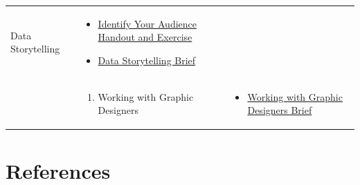 \documentclass[
]{book}
\providecommand{\tightlist}{%
  \setlength{\itemsep}{0pt}\setlength{\parskip}{0pt}}
\begin{document}
\begin{longtable}[]{@{}lll@{}}
\begin{minipage}[t]{0.34\columnwidth}
\begin{enumerate}
  Data Storytelling
\end{enumerate}\strut
\end{minipage} & \begin{minipage}[t]{0.42\columnwidth}\raggedright
\begin{itemize}
\tightlist
\item
  \href{files/M4S2_Data_Storytelling_Audience_Handout_Exercise.pdf}{Identify Your Audience Handout and Exercise}
\item
  \href{files/M4S2_Data_Storytelling_Brief.pdf}{Data Storytelling Brief}
\end{itemize}\strut
\end{minipage}\tabularnewline
\begin{minipage}[t]{0.15\columnwidth}\raggedright
\strut
\end{minipage} & \begin{minipage}[t]{0.34\columnwidth}\raggedright
\begin{enumerate}
\def\labelenumi{\arabic{enumi}.}
\setcounter{enumi}{2}
\tightlist
\item
  Working with Graphic Designers
\end{enumerate}\strut
\end{minipage} & \begin{minipage}[t]{0.42\columnwidth}\raggedright
\begin{itemize}
\tightlist
\item
  \href{files/M4S3_Working_With_Graphic_Designers_Brief.pdf}{Working with Graphic Designers Brief}
\end{itemize}\strut
\end{minipage}\tabularnewline
\bottomrule
\end{longtable}

\hypertarget{references}{%
\section{References}\label{references}}
\end{document}
